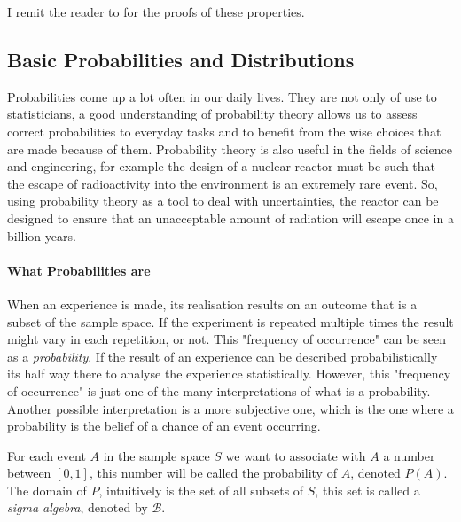\documentclass[
  oneside,
  11pt, a4paper,
  footinclude=true,
  headinclude=true,
  cleardoublepage=empty
]{scrbook}
\theoremstyle{definition}
\theoremstyle{definition}
\begin{document}
            I remit the reader to \cite{CaseBerg:01} for the proofs of these properties.
        
        \subsection{Basic Probabilities and Distributions}
        
            Probabilities come up a lot often in our daily lives. They are not only of use to statisticians, a good understanding of probability theory allows us to assess correct probabilities to everyday tasks and to benefit from the wise choices that are made because of them. Probability theory is also useful in the fields of science and engineering, for example the design of a nuclear reactor must be such that the escape of radioactivity into the environment is an extremely rare event. So, using probability theory as a tool to deal with uncertainties, the reactor can be designed to ensure that an unacceptable amount of radiation will escape once in a billion years.
            
	        \paragraph{What Probabilities are}
            
                When an experience is made, its realisation results on an outcome that is a subset of the sample space. If the experiment is repeated multiple times the result might vary in each repetition, or not. This "frequency of occurrence" can be seen as a \emph{probability}. If the result of an experience can be described probabilistically its half way there to analyse the experience statistically. However, this "frequency of occurrence" is just one of the many interpretations of what is a probability. Another possible interpretation is a more subjective one, which is the one where a probability is the belief of a chance of an event occurring.
                
                For each event $A$ in the sample space $S$ we want to associate with $A$ a number between $[0, 1]$, this number will be called the probability of $A$, denoted $P(A)$. The domain of $P$, intuitively is the set of all subsets of $S$, this set is called a \emph{sigma algebra}, denoted by $\mathscr{B}$.%
                
\end{document}
